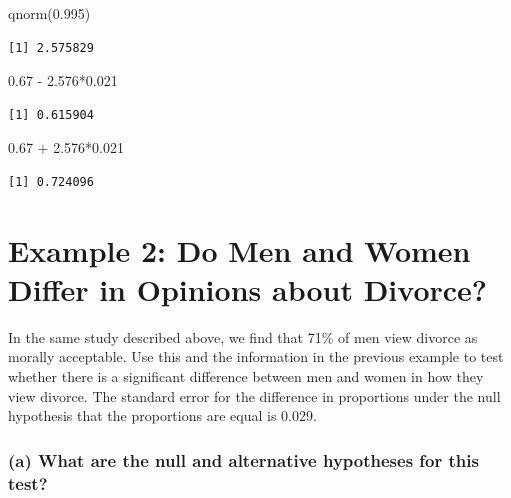 \documentclass[
]{book}
\newenvironment{Shaded}{\begin{snugshade}}{\end{snugshade}}
\newcommand{\FloatTok}[1]{\textcolor[rgb]{0.00,0.00,0.81}{#1}}
\newcommand{\FunctionTok}[1]{\textcolor[rgb]{0.00,0.00,0.00}{#1}}
\newcommand{\NormalTok}[1]{#1}
\newcommand{\SpecialCharTok}[1]{\textcolor[rgb]{0.00,0.00,0.00}{#1}}
\begin{document}
\begin{Shaded}
\begin{Highlighting}[]
\FunctionTok{qnorm}\NormalTok{(}\FloatTok{0.995}\NormalTok{)}
\end{Highlighting}
\end{Shaded}

\begin{verbatim}
[1] 2.575829
\end{verbatim}

\begin{Shaded}
\begin{Highlighting}[]
\FloatTok{0.67} \SpecialCharTok{{-}} \FloatTok{2.576}\SpecialCharTok{*}\FloatTok{0.021}
\end{Highlighting}
\end{Shaded}

\begin{verbatim}
[1] 0.615904
\end{verbatim}

\begin{Shaded}
\begin{Highlighting}[]
\FloatTok{0.67} \SpecialCharTok{+} \FloatTok{2.576}\SpecialCharTok{*}\FloatTok{0.021}
\end{Highlighting}
\end{Shaded}

\begin{verbatim}
[1] 0.724096
\end{verbatim}

\hypertarget{example-2-do-men-and-women-differ-in-opinions-about-divorce}{%
\section{Example 2: Do Men and Women Differ in Opinions about Divorce?}\label{example-2-do-men-and-women-differ-in-opinions-about-divorce}}

In the same study described above, we find that 71\% of men view divorce as morally acceptable. Use this and the information in the previous example to test whether there is a significant difference between men and women in how they view divorce. The standard error for the difference in proportions under the null hypothesis that the proportions are equal is 0.029.

\hypertarget{a-what-are-the-null-and-alternative-hypotheses-for-this-test-1}{%
\subsubsection{(a) What are the null and alternative hypotheses for this test?}\label{a-what-are-the-null-and-alternative-hypotheses-for-this-test-1}}
\end{document}
